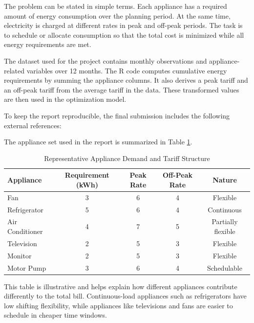 \documentclass[12pt,a4paper]{article}
\newcommand{\datasetlink}{\href{https://www.kaggle.com/datasets/suraj520/indian-household-electricity-bill}}
\newcommand{\githublink}{\href{https://github.com/rangerbelx/Electricity-Bill-Minimization-Using-Linear-Optimization/}}
\newcommand{\rcodefile}{\href{https://github.com/rangerbelx/Electricity-Bill-Minimization-Using-Linear-Optimization/blob/main/electricity_optimization.R}{R Script}}
\begin{document}
The problem can be stated in simple terms. Each appliance has a required amount of energy consumption over the planning period. At the same time, electricity is charged at different rates in peak and off-peak periods. The task is to schedule or allocate consumption so that the total cost is minimized while all energy requirements are met.

The dataset used for the project contains monthly observations and appliance-related variables over 12 months. The R code computes cumulative energy requirements by summing the appliance columns. It also derives a peak tariff and an off-peak tariff from the average tariff in the data. These transformed values are then used in the optimization model.

To keep the report reproducible, the final submission includes the following external references:


The appliance set used in the report is summarized in Table \ref{tab:data}.

\begin{table}[H]
\centering
\caption{Representative Appliance Demand and Tariff Structure}
\label{tab:data}
\renewcommand{\arraystretch}{1.2}
\begin{tabular}{lcccc}
\toprule
\textbf{Appliance} & \textbf{Requirement (kWh)} & \textbf{Peak Rate} & \textbf{Off-Peak Rate} & \textbf{Nature} \\
\midrule
Fan & 3 & 6 & 4 & Flexible \\
Refrigerator & 5 & 6 & 4 & Continuous \\
Air Conditioner & 4 & 7 & 5 & Partially flexible \\
Television & 2 & 5 & 3 & Flexible \\
Monitor & 2 & 5 & 3 & Flexible \\
Motor Pump & 3 & 6 & 4 & Schedulable \\
\bottomrule
\end{tabular}
\end{table}

This table is illustrative and helps explain how different appliances contribute differently to the total bill. Continuous-load appliances such as refrigerators have low shifting flexibility, while appliances like televisions and fans are easier to schedule in cheaper time windows.
\end{document}
